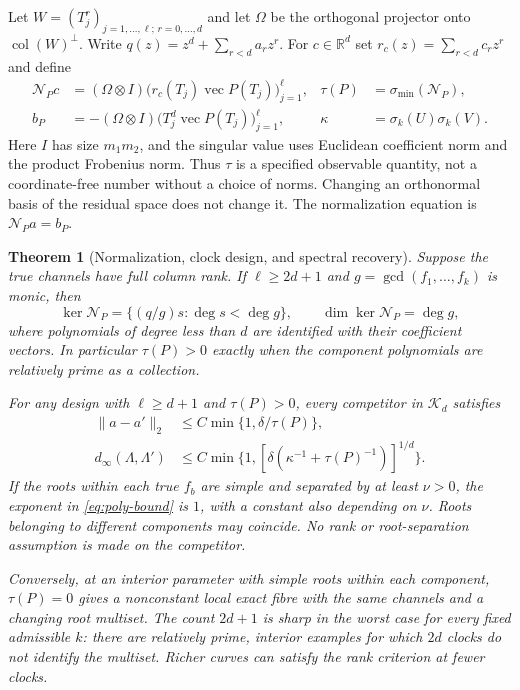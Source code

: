 \documentclass[11pt,reqno]{amsart}
\numberwithin{equation}{section}
\newtheorem{theorem}{Theorem}[section]
\theoremstyle{definition}\newtheorem{definition}[theorem]{Definition}
\theoremstyle{remark}\newtheorem{remark}[theorem]{Remark}
\newcommand{\R}{\mathbb R}
\newcommand{\cK}{\mathcal K}
\newcommand{\cN}{\mathcal N}
\begin{document}
Let $W=(T_j^r)_{j=1,\ldots,\ell;\,r=0,\ldots,d}$ and let $\Omega$
be the orthogonal projector onto $\operatorname{col}(W)^\perp$. Write
$q(z)=z^d+\sum_{r<d}a_rz^r$. For $c\in\R^d$ set
$r_c(z)=\sum_{r<d}c_rz^r$ and define
\begin{align}
 \cN_Pc&=(\Omega\otimes I)
       \big(r_c(T_j)\operatorname{vec}P(T_j)\big)_{j=1}^{\ell},
       &\tau(P)&=\sigma_{\min}(\cN_P),\nonumber\\
 b_P&=-(\Omega\otimes I)
       \big(T_j^d\operatorname{vec}P(T_j)\big)_{j=1}^{\ell},
       &\kappa&=\sigma_k(U)\sigma_k(V).           \label{eq:normalization}
\end{align}
Here $I$ has size $m_1m_2$, and the singular value uses Euclidean
coefficient norm and the product Frobenius norm. Thus $\tau$ is a
specified observable quantity, not a coordinate-free number without a
choice of norms. Changing an orthonormal basis of the residual space
does not change it. The normalization equation is $\cN_Pa=b_P$.

\begin{theorem}[Normalization, clock design, and spectral recovery]
\label{thm:main}
Suppose the true channels have full column rank.
If $\ell\ge2d+1$ and $g=\gcd(f_1,\ldots,f_k)$ is monic, then
\begin{equation}\label{eq:kernel}
 \ker\cN_P=\{(q/g)s:\deg s<\deg g\},\qquad
 \dim\ker\cN_P=\deg g,
\end{equation}
where polynomials of degree less than $d$ are identified with their
coefficient vectors. In particular $\tau(P)>0$ exactly when the
component polynomials are relatively prime as a collection.

For any design with $\ell\ge d+1$ and $\tau(P)>0$, every competitor
in $\cK_d$ satisfies
\begin{align}
 \|a-a'\|_2&\le C\min\{1,\delta/\tau(P)\},        \label{eq:q-bound}\\
 d_\infty(\Lambda,\Lambda')&\le
 C\min\{1,[\delta(\kappa^{-1}+\tau(P)^{-1})]^{1/d}\}.
                                                        \label{eq:poly-bound}
\end{align}
If the roots within each true $f_b$ are simple and separated by at least
$\nu>0$, the exponent in \eqref{eq:poly-bound} is $1$, with a constant
also depending on $\nu$. Roots belonging to different components may
coincide. No rank or root-separation assumption is made on the competitor.

Conversely, at an interior parameter with simple roots within each
component, $\tau(P)=0$ gives a nonconstant local exact fibre with the
same channels and a changing root multiset. The count $2d+1$ is sharp
in the worst case for every fixed admissible $k$: there are relatively
prime, interior examples for which $2d$ clocks do not identify the
multiset. Richer curves can satisfy the rank criterion at fewer clocks.
\end{theorem}
\end{document}
